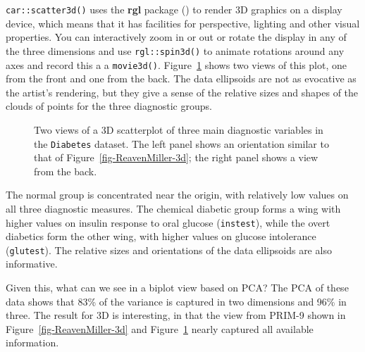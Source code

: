 \documentclass[
  letterpaper,
  10pt,
  krantz2]{krantz}
\begin{document}
{\texttt{car::scatter3d()} uses the \textbf{rgl} package
() to render 3D graphics on
a display device, which means that it has facilities for perspective,
lighting and other visual properties. You can interactively zoom in or
out or rotate the display in any of the three dimensions and use
\texttt{rgl::spin3d()} to animate rotations around any axes and record
this a a \texttt{movie3d()}. Figure~\ref{fig-diabetes-3d} shows two
views of this plot, one from the front and one from the back. The data
ellipsoids are not as evocative as the artist's rendering, but they give
a sense of the relative sizes and shapes of the clouds of points for the
three diagnostic groups.

\begin{figure}


\caption{\label{fig-diabetes-3d}Two views of a 3D scatterplot of three
main diagnostic variables in the \texttt{Diabetes} dataset. The left
panel shows an orientation similar to that of
Figure~\ref{fig-ReavenMiller-3d}; the right panel shows a view from the
back.}

\end{figure}%

The normal group is concentrated near the origin, with relatively low
values on all three diagnostic measures. The chemical diabetic group
forms a wing with higher values on insulin response to oral glucose
(\texttt{instest}), while the overt diabetics form the other wing, with
higher values on glucose intolerance (\texttt{glutest}). The relative
sizes and orientations of the data ellipsoids are also informative.

Given this, what can we see in a biplot view based on PCA? The PCA of
these data shows that 83\% of the variance is captured in two dimensions
and 96\% in three. The result for 3D is interesting, in that the view
from PRIM-9 shown in Figure~\ref{fig-ReavenMiller-3d} and
Figure~\ref{fig-diabetes-3d} nearly captured all available information.

}
\end{document}
